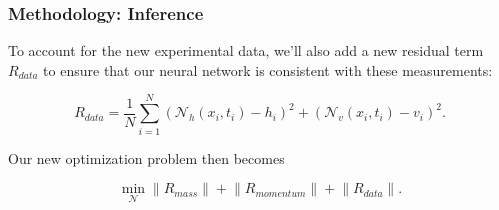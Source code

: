 \begin{frame}
    \frametitle{Methodology: Inference}

    To account for the new experimental data, we'll also add a new residual term $R_{data}$ to ensure that our neural
    network is consistent with these measurements:

    $$
    R_{data} = \frac{1}{N} \sum\limits_{i=1}^N \left( \mathcal{N}_h (x_i, t_i) - h_i \right)^2 
                                             + \left( \mathcal{N}_v (x_i, t_i) - v_i \right)^2.
    $$

    \bigskip
    \pause
    Our new optimization problem then becomes

    $$
    \min_{\mathcal{N}} {\lVert R_{mass} \rVert + \lVert R_{momentum} \rVert + \lVert R_{data} \rVert}.
    $$

\end{frame}